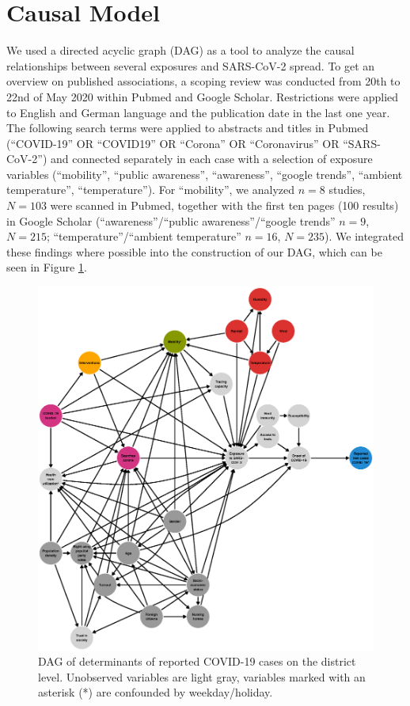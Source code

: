 \documentclass[]{elsarticle} %
\begin{document}
\hypertarget{causal-model}{%
\section{Causal Model}\label{causal-model}}

We used a directed acyclic graph (DAG) \citep{schipf_directed_2011, textor_robust_2017} as a tool to analyze the causal relationships between several exposures and SARS-CoV-2 spread. To get an overview on published associations, a scoping review was conducted from 20th to 22nd of May 2020 within Pubmed and Google Scholar. Restrictions were applied to English and German language and the publication date in the last one year. The following search terms were applied to abstracts and titles in Pubmed (``COVID-19'' OR ``COVID19'' OR ``Corona'' OR ``Coronavirus'' OR ``SARS-CoV-2'') and connected separately in each case with a selection of exposure variables (``mobility'', ``public awareness'', ``awareness'', ``google trends'', ``ambient temperature'', ``temperature''). For ``mobility'', we analyzed \(n=8\) studies, \(N=103\) were scanned in Pubmed, together with the first ten pages (100 results) in Google Scholar (``awareness''/``public awareness''/``google trends'' \(n=9\), \(N=215\); ``temperature''/``ambient temperature'' \(n=16\), \(N=235\)). We integrated these findings where possible into the construction of our DAG, which can be seen in Figure \ref{fig:dag-covid-19}.

\begin{figure}
\centering
\includegraphics{figures/f_full_covid19_dag.eps}
\caption{\label{fig:dag-covid-19}DAG of determinants of reported COVID-19 cases on the district level. Unobserved variables are light gray, variables marked with an asterisk (*) are confounded by weekday/holiday.}
\end{figure}
\end{document}
